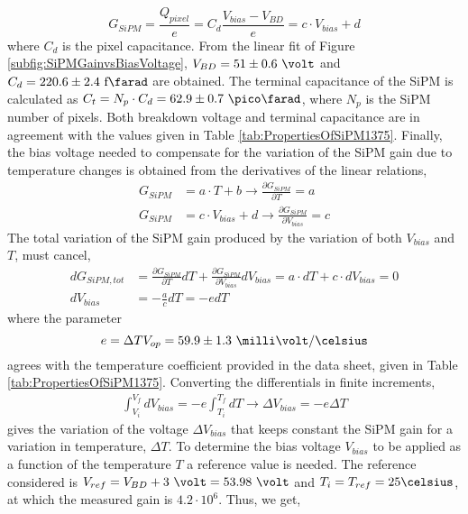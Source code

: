 \begin{equation}
G_{SiPM}=\frac{Q_{pixel}}{e} = C_d \frac{V_{bias}-V_{BD}}{e} = c \cdot{} V_{bias}+d
\label{SiPMGain_Capacitance}
\end{equation}
where $C_d$ is the pixel capacitance. From the linear fit of Figure \ref{subfig:SiPMGainvsBiasVoltage}, $V_{BD}=51 \pm 0.6~\volt$ and $C_d{}= 220.6 \pm 2.4~\text{f}\farad$ are obtained. The terminal capacitance of the SiPM is calculated as $C_{t}=N_{p} \cdot{} C_{d}=62.9 \pm 0.7~\pico\farad$, where $N_{p}$ is the SiPM number of pixels. Both breakdown voltage and terminal capacitance are in agreement with the values given in Table \ref{tab:PropertiesOfSiPM1375}. Finally, the bias voltage needed to compensate for the variation of the SiPM gain due to temperature changes is obtained from the derivatives of the linear relations,
\begin{equation*}
\begin{split}
G_{SiPM}&=a \cdot{} T + b  \longrightarrow \frac{\partial G_{SiPM}}{\partial T}= a \\
G_{SiPM}&=c \cdot{} V_{bias} + d \longrightarrow \frac{\partial G_{SiPM}}{\partial V_{bias}} = c
\label{Gain_compensationVariations}
\end{split}
\end{equation*} 
The total variation of the SiPM gain produced by the variation of both $V_{bias}$ and $T$, must cancel,
\begin{equation*}
\begin{split}
d G_{SiPM, tot}&= \frac{\partial G_{SiPM}}{\partial T} dT + \frac{\partial G_{SiPM}}{\partial V_{bias}} dV_{bias} = a \cdot{} dT + c \cdot{} dV_{bias} = 0\\ 
dV_{bias}  &= - \frac{a}{c} dT = - e dT
\label{Gain_compensation0}
\end{split}
\end{equation*} 
where the parameter $$e = \Delta T V_{op} = 59.9 \pm 1.3~\milli\volt/\celsius $$ agrees with the temperature coefficient provided in the data sheet, given in Table \ref{tab:PropertiesOfSiPM1375}. Converting the differentials in finite increments,
\begin{equation}
\begin{split}
\int_{V_i}^{V_f} dV_{bias}  = -e\int_{T_i}^{T_f} dT \longrightarrow \Delta V_{bias} = -e \Delta T
\label{Gain_compensationIntegring}
\end{split}
\end{equation} 
gives the variation of the voltage $\Delta V_{bias}$ that keeps constant the SiPM gain for a variation in temperature, $\Delta T$. To determine the bias voltage $V_{bias}$ to be applied as a function of the temperature $T$ a reference value is needed. The reference considered is $V_{ref}= V_{BD}+3~\volt = 53.98~\volt$ and $T_i=T_{ref}=25\celsius$, at which the measured gain is $4.2 \cdot{} 10^{6}$. Thus, we get,
